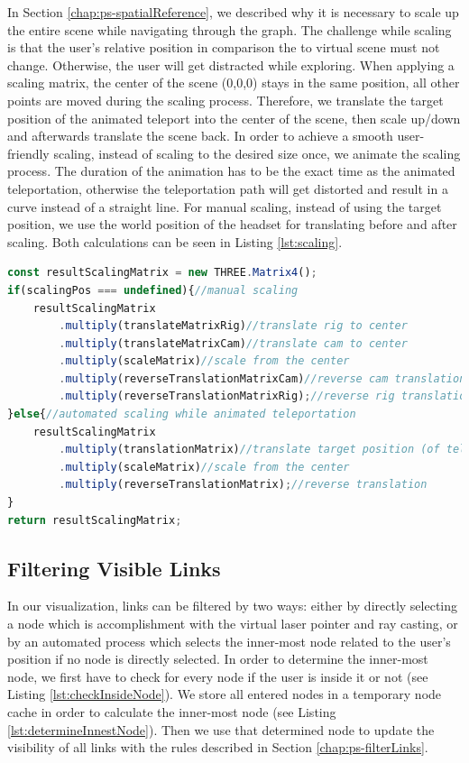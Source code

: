 In Section \ref{chap:ps-spatialReference}, we described why it is necessary to scale up the entire scene while navigating through the graph. 
The challenge while scaling is that the user's relative position in comparison the to virtual scene must not change. Otherwise, the user will get distracted while exploring.
When applying a scaling matrix, the center of the scene (0,0,0) stays in the same position, all other points are moved during the scaling process. 
Therefore, we translate the target position of the animated teleport into the center of the scene, then scale up/down and afterwards translate the scene back.
In order to achieve a smooth user-friendly scaling, instead of scaling to the desired size once, we animate the scaling process. The duration of the animation has to be the exact time as the animated teleportation, otherwise the teleportation path will get distorted and result in a curve instead of a straight line.
For manual scaling, instead of using the target position, we use the world position of the headset for translating before and after scaling. Both calculations can be seen in Listing \ref{lst:scaling}.
\pagebreak

\begin{lstlisting}[language=JavaScript,label={lst:scaling},caption=Simplified algorithm for calculating the scaling matrix]
const resultScalingMatrix = new THREE.Matrix4();
if(scalingPos === undefined){//manual scaling
    resultScalingMatrix
        .multiply(translateMatrixRig)//translate rig to center
        .multiply(translateMatrixCam)//translate cam to center
        .multiply(scaleMatrix)//scale from the center
        .multiply(reverseTranslationMatrixCam)//reverse cam translation
        .multiply(reverseTranslationMatrixRig);//reverse rig translation
}else{//automated scaling while animated teleportation
    resultScalingMatrix
        .multiply(translationMatrix)//translate target position (of teleport) to center
        .multiply(scaleMatrix)//scale from the center
        .multiply(reverseTranslationMatrix);//reverse translation
}
return resultScalingMatrix;
\end{lstlisting}

\pagebreak

\subsection{Filtering Visible Links}
\label{sec:linkFiltering}

In our visualization, links can be filtered by two ways: either by directly selecting a node which is accomplishment with the virtual laser pointer and ray casting, or by an automated process which selects the inner-most node related to the user's position if no node is directly selected.
In order to determine the inner-most node, we first have to check for every node if the user is inside it or not (see Listing \ref{lst:checkInsideNode}). We store all entered nodes in a temporary node cache in order to calculate the inner-most node (see Listing \ref{lst:determineInnestNode}).
Then we use that determined node to update the visibility of all links with the rules described in Section \ref{chap:ps-filterLinks}.

